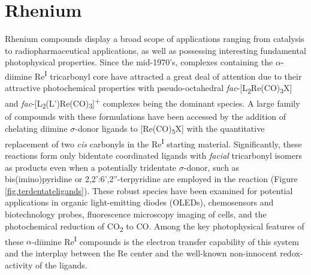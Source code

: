 \section{Rhenium}

Rhenium compounds display a broad scope of applications ranging from catalysis\autocite{dudle2011, jain2008, kuninobu2011} to radiopharmaceutical applications\autocite{bartholoma2009, schibli2002}, as well as possessing interesting fundamental photophysical properties\autocite{coogan2009}. Since the mid-1970's, complexes containing the $\alpha$-diimine Re\textsuperscript{I} tricarbonyl core have attracted a great deal of attention due to their attractive photochemical properties with pseudo-octahedral \textit{fac}-[L\textsubscript{2}Re(CO)\textsubscript{3}X] and \textit{fac}-[L\textsubscript{2}(L')Re(CO)\textsubscript{3}]\textsuperscript{+} complexes being the dominant species\autocite{giordano1979, sacksteder1990, caspar1983, yam2001, feliz1998, ruiz1996, lin1992, hino1992, walters2002, striplin2001}. A large family of compounds with these formulations have been accessed by the addition of chelating diimine $\sigma$-donor ligands to [Re(CO)\textsubscript{5}X] with the quantitative replacement of two \textit{cis} carbonyls in the Re\textsuperscript{I} starting material\autocite{giordano1979, martin2011, abel1959, kirkham1965, zingales1967, gamelin1994, marti2005, morse1976, giordano1978}. Significantly, these reactions form only bidentate coordinated ligands with \textit{facial} tricarbonyl isomers as products even when a potentially tridentate $\sigma$-donor, such as bis(imino)pyridine or 2,2':6',2''-terpyridine are employed in the reaction (Figure \ref{fig.terdentateligands})\autocite{granifo1999, orrell1997, abel1993}. These robust species have been examined for potential applications in organic light-emitting diodes (OLEDs)\autocite{gong1998}, chemosensors and biotechnology probes\autocite{lo2010, lin2007, slone1995, beer1999, beer2003}, fluorescence microscopy imaging of cells\autocite{lo2010, amoroso2008, amoroso2007}, and the photochemical reduction of CO\textsubscript{2} to CO\autocite{hawecker1983, hawecker1986, takeda2010, christensen1992, sullivan1985}. Among the key photophysical features of these $\alpha$-diimine Re\textsuperscript{I} compounds is the electron transfer capability of this system and the interplay between the Re center and the well-known non-innocent redox-activity of the ligands\autocite{caulton2012}.

